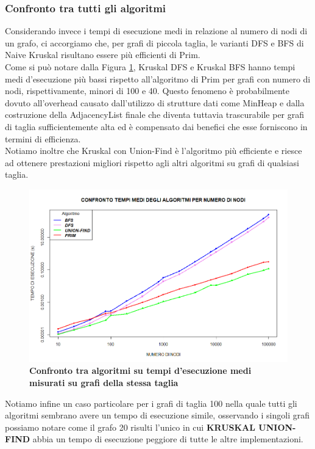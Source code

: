 \documentclass[]{article}
\begin{document}
\begin{flushleft}
\newpage
\subsubsection{Confronto tra tutti gli algoritmi}
Considerando invece i tempi di esecuzione medi in relazione al numero di nodi di un grafo, ci accorgiamo che, per grafi di piccola taglia, le varianti DFS e BFS di Naive Kruskal risultano essere più efficienti di Prim.\\
Come si può notare dalla Figura \ref{conf_tot}, Kruskal DFS e Kruskal BFS hanno tempi medi d'esecuzione più bassi rispetto all'algoritmo di Prim per grafi con numero di nodi, rispettivamente, minori di 100 e 40.
Questo fenomeno è probabilmente dovuto all'overhead causato dall'utilizzo di strutture dati come MinHeap e dalla costruzione della AdjacencyList finale che diventa tuttavia trascurabile per grafi di taglia sufficientemente alta ed è compensato dai benefici che esse forniscono in termini di efficienza.\\
Notiamo inoltre che Kruskal con Union-Find è l'algoritmo più efficiente e riesce ad ottenere prestazioni migliori rispetto agli altri algoritmi su grafi di qualsiasi taglia.\\
\begin{figure}[h]
	\centering
	\includegraphics[width=\textwidth,height=\textheight,keepaspectratio]{CONFRONTO_TOTALE.png}
	\caption{\textbf{Confronto tra algoritmi su tempi d'esecuzione medi misurati su grafi della stessa taglia}}
	\label{conf_tot}
\end{figure}
Notiamo infine un caso particolare per i grafi di taglia 100 nella quale tutti gli algoritmi sembrano avere un tempo di esecuzione simile, osservando i singoli grafi possiamo notare come il grafo 20 risulti l'unico in cui \textbf{KRUSKAL UNION-FIND} abbia un tempo di esecuzione peggiore di tutte le altre implementazioni.


\end{flushleft}
\end{document}

